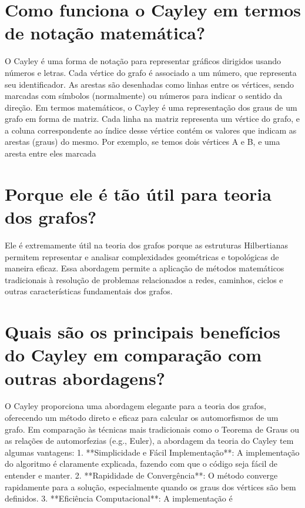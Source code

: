 \documentclass[11pt,a4paper]{article}
\begin{document}
\section{Como funciona o Cayley em termos de notação matemática?}
O Cayley é uma forma de notação para representar gráficos dirigidos usando números e letras. Cada vértice do grafo é associado a um número, que representa seu identificador. As arestas são desenhadas como linhas entre os vértices, sendo marcadas com símbolos (normalmente) ou números para indicar o sentido da direção. Em termos matemáticos, o Cayley é uma representação dos graus de um grafo em forma de matriz. Cada linha na matriz representa um vértice do grafo, e a coluna correspondente ao índice desse vértice contém os valores que indicam as arestas (graus) do mesmo. Por exemplo, se temos dois vértices A e B, e uma aresta entre eles marcada

\section{Porque ele é tão útil para teoria dos grafos?}
Ele é extremamente útil na teoria dos grafos porque as estruturas Hilbertianas permitem representar e analisar complexidades geométricas e topológicas de maneira eficaz. Essa abordagem permite a aplicação de métodos matemáticos tradicionais à resolução de problemas relacionados a redes, caminhos, ciclos e outras características fundamentais dos grafos.

\section{Quais são os principais benefícios do Cayley em comparação com outras abordagens?}
O Cayley proporciona uma abordagem elegante para a teoria dos grafos, oferecendo um método direto e eficaz para calcular os automorfismos de um grafo. Em comparação às técnicas mais tradicionais como o Teorema de Graus ou as relações de automorfezias (e.g., Euler), a abordagem da teoria do Cayley tem algumas vantagens: 1. **Simplicidade e Fácil Implementação**: A implementação do algoritmo é claramente explicada, fazendo com que o código seja fácil de entender e manter. 2. **Rapididade de Convergência**: O método converge rapidamente para a solução, especialmente quando os graus dos vértices são bem definidos. 3. **Eficiência Computacional**: A implementação é
\end{document}
